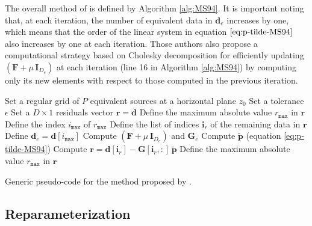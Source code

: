 The overall method of \cite{mendonca-silva1994} is defined by Algorithm \ref{alg:MS94}.
It is important noting that, at each iteration, the number of equivalent data in $\mathbf{d}_{e}$ increases by one,
which means that the order of the linear system in equation $\ref{eq:p-tilde-MS94}$ also increases by one at each iteration.
Those authors also propose a computational strategy based on Cholesky decomposition for efficiently updating 
$\left(\mathbf{F} + \mu \, \mathbf{I}_{D_{e}} \right)$ at each iteration (line 16 in Algorithm \ref{alg:MS94}) 
by computing only its new elements with respect to those computed in the previous iteration.

\begin{algorithm}
	\Input{}
	Set a regular grid of $P$ equivalent sources at a horizontal plane $z_{0}$ \;
	Set a tolerance $\epsilon$ \;
	Set a $D \times 1$ residuals vector $\mathbf{r} = \mathbf{d}$ \;
	Define the maximum absolute value $r_{\mathtt{max}}$ in $\mathbf{r}$ \; 
	Define the index $i_{\mathtt{max}}$ of $r_{\mathtt{max}}$ \;
	Define the list of indices $\mathbf{i}_{r}$ of the remaining data in $\mathbf{r}$ \;
	Define $\mathbf{d}_{e} = \mathbf{d}[i_{\mathtt{max}}] $ \;
	Compute $\left(\mathbf{F} + \mu \, \mathbf{I}_{D_{e}} \right)$ and $\mathbf{G}_{e}$ \;
	Compute $\tilde{\mathbf{p}}$ (equation \ref{eq:p-tilde-MS94}) \;
	Compute $\mathbf{r} = \mathbf{d}[\mathbf{i}_{r}] - \mathbf{G}[\mathbf{i}_{r}, :] \, \tilde{\mathbf{p}}$ \;
	Define the maximum absolute value $r_{\mathtt{max}}$ in $\mathbf{r}$ \; 
	\caption{Generic pseudo-code for the method proposed by \cite{mendonca-silva1994}.}
	\label{alg:MS94}
\end{algorithm}

\subsection{Reparameterization}


